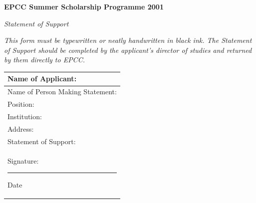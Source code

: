 \documentclass[a4paper]{article}
\begin{document}
\newpage
\centerline{\LARGE \bf EPCC Summer Scholarship Programme 2001}
\vskip 2mm

\centerline{\LARGE \it Statement of Support}
\vskip 2mm


{\it
This form must be typewritten or neatly handwritten in black ink.  The
Statement of Support should be completed by the applicant's director of
studies and returned by them directly to EPCC.}

\begin{tabular}{|p{0.98\hsize}|}
\hline
%
Name of Applicant:
%
\rule{0mm}{6mm} \\
\hline
%
Name of Person Making Statement:
%
\rule{0mm}{6mm} \\
\hline
%
Position:
%
\rule{0mm}{6mm} \\
\hline
%
Institution:
%
\rule{0mm}{6mm} \\
\hline
%
Address:
%
\rule[-12mm]{0mm}{18mm} \\
\hline
%
Statement of Support:
%
\rule[-124mm]{0mm}{130mm} \\
\hline
%
Signature: \hspace{0.6\hsize}\rule[-2mm]{0.2mm}{6mm} Date \\
\hline
%
\end{tabular}
\end{document}
